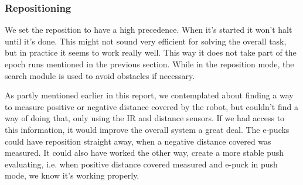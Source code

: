 \subsubsection{Repositioning}
We set the reposition to have a high precedence. When it's started it won't halt until it’s done. This might not sound very efficient for solving the overall task, but in practice it seems to work really well. This way it does not take part of the epoch runs mentioned in the previous section. While in the reposition mode, the search module is used to avoid obstacles if necessary.  

As partly mentioned earlier in this report, we contemplated about finding a way to measure positive or negative distance covered by the robot, but couldn't find a way of doing that, only using the IR and distance sensors. If we had access to this information, it would improve the overall system a great deal. The e-pucks could have reposition straight away, when a negative distance covered was measured. It could also have worked the other way, create a more stable push evaluating, i.e. when positive distance covered measured and e-puck in push mode, we know it's working properly. 